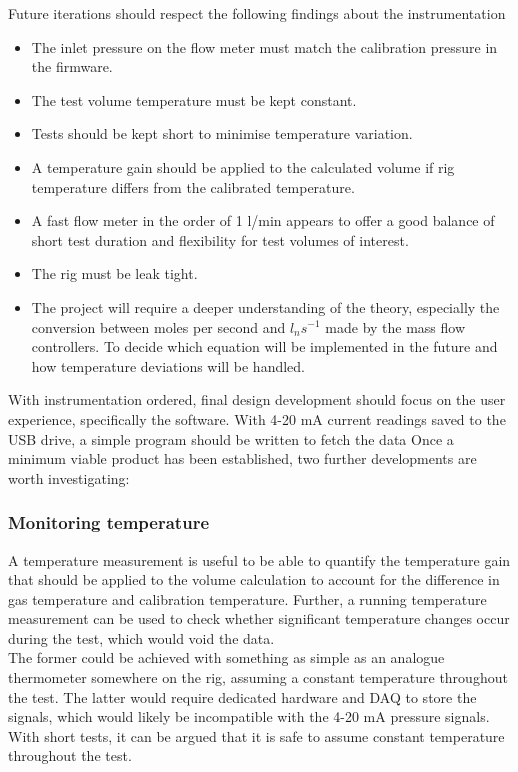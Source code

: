 \documentclass{report}
\begin{document}
Future iterations should respect the following findings about the instrumentation
\begin{itemize}
	\item The inlet pressure on the flow meter must match the calibration pressure  in the firmware.
	\item The test volume temperature must be kept constant.
	\item Tests should be kept short to minimise temperature variation. 
	\item A temperature gain should be applied to the calculated volume if rig temperature differs from the calibrated temperature.
	\item A fast flow meter in the order of 1 l/min appears to offer a good balance of short test duration and flexibility for test volumes of interest.
	\item The rig must be leak tight.
	\item The project will require a deeper understanding of the theory, especially the conversion between moles per second and $l_ns^{-1}$ made by the mass flow controllers. To decide which equation will be implemented in the future and how temperature deviations will be handled.
\end{itemize}	
With instrumentation ordered, final design development should focus on the user experience, specifically the software. With 4-20 mA current readings saved to the USB drive, a simple program should be written to fetch the data 
Once a minimum viable product has been established, two further developments are worth investigating:
\subsubsection{Monitoring temperature} 
A temperature measurement is useful to be able to quantify the temperature gain that should be applied to the volume calculation to account for the difference in gas temperature and calibration temperature. Further, a running temperature measurement can be used to check whether significant temperature changes occur during the test, which would void the data.\\
The former could be achieved with something as simple as an analogue thermometer somewhere on the rig, assuming a constant temperature throughout the test. The latter would require dedicated hardware and DAQ to store the signals, which would likely be incompatible with the 4-20 mA pressure signals. With short tests, it can be argued that it is safe to assume constant temperature throughout the test.
\end{document}
